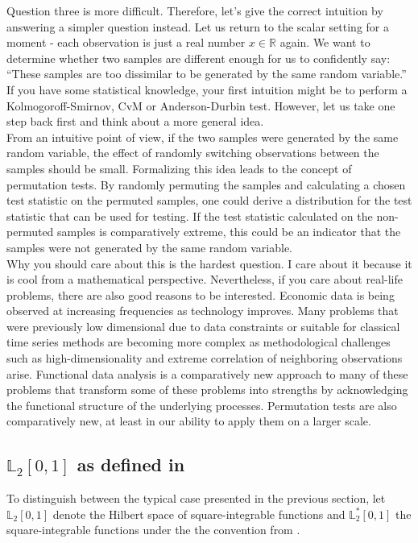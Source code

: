 \documentclass[12pt, a4paper]{article}
\theoremstyle{MAstyle} \newtheorem{assumption}{Assumption}[section]
\theoremstyle{MAstyle} \newtheorem{definition}{Definition}[section]
\theoremstyle{MAstyle} \newtheorem{theorem}{Theorem}[section]
\begin{document}
			Question three is more difficult. Therefore, let's give the correct intuition by answering a simpler question instead. Let us return to the scalar setting for a moment - each observation is just a real number $x \in \mathbb{R}$ again. We want to determine whether two samples are different enough for us to confidently say: ``These samples are too dissimilar to be generated by the same random variable.'' If you have some statistical knowledge, your first intuition might be to perform a Kolmogoroff-Smirnov, CvM or Anderson-Durbin test. However, let us take one step back first and think about a more general idea.\\
			
			From an intuitive point of view, if the two samples were generated by the same random variable, the effect of randomly switching observations between the samples should be small. Formalizing this idea leads to the concept of permutation tests. By randomly permuting the samples and calculating a chosen test statistic on the permuted samples, one could derive a distribution for the test statistic that can be used for testing. If the test statistic calculated on the non-permuted samples is comparatively extreme, this could be an indicator that the samples were not generated by the same random variable.\\
			
			Why you should care about this is the hardest question. I care about it because it is cool from a mathematical perspective. Nevertheless, if you care about real-life problems, there are also good reasons to be interested. Economic data is being observed at increasing frequencies as technology improves. Many problems that were previously low dimensional due to data constraints or suitable for classical time series methods are becoming more complex as methodological challenges such as high-dimensionality and extreme correlation of neighboring observations arise. Functional data analysis is a comparatively new approach to many of these problems that transform some of these problems into strengths by acknowledging the functional structure of the underlying processes. Permutation tests are also comparatively new, at least in our ability to apply them on a larger scale.
			
		\subsection{$\mathbb{L}_2[0,1]$ as defined in \cite{bugni_permutation_2021}}\label{deviation}
		To distinguish between the typical case presented in the previous section, let $\mathbb{L}_2[0,1]$ denote the Hilbert space of square-integrable functions and $\mathbb{L}^{*}_2[0,1]$ the square-integrable functions under the the convention from \cite{bugni_permutation_2021}.\\
		
\end{document}
